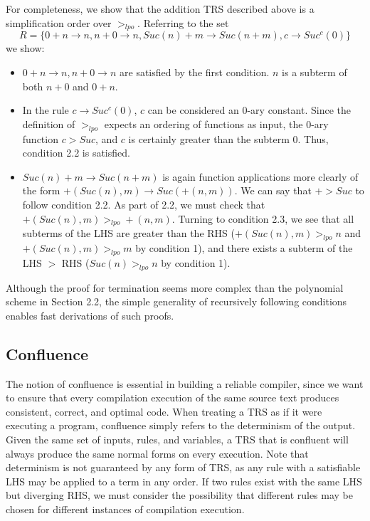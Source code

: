 \documentclass{article}
\begin{document}
For completeness, we show that the addition TRS described above is a simplification order over $>_{lpo}$.
Referring to the set
\[R = \{0 + n \rightarrow n, n + 0 \rightarrow n, Suc(n) + m \rightarrow Suc(n+m), c \rightarrow Suc^c(0)\}\]
we show:
\begin{itemize}
    \item $0 + n \rightarrow n, n + 0 \rightarrow n$ are satisfied by the first condition. $n$ is a subterm of both $n+0$ and $0+n$.
    \item In the rule $c \rightarrow Suc^c(0)$, $c$ can be considered an 0-ary constant. Since the definition of $>_{lpo}$
    expects an ordering of functions as input, the 0-ary function $c > Suc$, and $c$ is certainly greater than the subterm 0.
    Thus, condition 2.2 is satisfied.
    \item $Suc(n) + m \rightarrow Suc(n+m)$ is again function applications more clearly of the form $+(Suc(n), m) \rightarrow Suc(+(n,m))$.
    We can say that $+ > Suc$ to follow condition 2.2. As part of 2.2, we must check that $+(Suc(n), m) >_{lpo} +(n,m)$. Turning to condition 2.3,
    we see that all subterms of the LHS are greater than the RHS ($+(Suc(n), m) >_{lpo} n$ and $+(Suc(n), m) >_{lpo} m$ by condition 1),
    and there exists a subterm of the LHS $>$ RHS ($Suc(n) >_{lpo} n$ by condition 1).
\end{itemize}
Although the proof for termination seems more complex than the polynomial scheme in Section 2.2, the simple generality of recursively following conditions
enables fast derivations of such proofs.

\subsection{Confluence}
The notion of confluence is essential in building a reliable compiler, since we want to ensure that every
compilation execution of the same source text produces consistent, correct, and optimal code.
When treating a TRS as if it were executing a program, confluence simply refers to the determinism of the output.
Given the same set of inputs, rules, and variables, a TRS that is confluent will always produce the same normal forms
on every execution. Note that determinism is not guaranteed by any form of TRS, as any rule with a satisfiable LHS
may be applied to a term in any order. If two rules exist with the same LHS but diverging RHS, we must consider the possibility
that different rules may be chosen for different instances of compilation execution.
\end{document}
